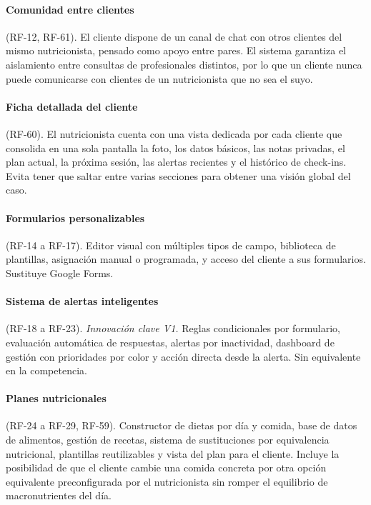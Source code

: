\paragraph{Comunidad entre clientes} (RF-12, RF-61). El cliente dispone de un canal de chat con otros clientes del mismo nutricionista, pensado como apoyo entre pares. El sistema garantiza el aislamiento entre consultas de profesionales distintos, por lo que un cliente nunca puede comunicarse con clientes de un nutricionista que no sea el suyo.

\paragraph{Ficha detallada del cliente} (RF-60). El nutricionista cuenta con una vista dedicada por cada cliente que consolida en una sola pantalla la foto, los datos básicos, las notas privadas, el plan actual, la próxima sesión, las alertas recientes y el histórico de check-ins. Evita tener que saltar entre varias secciones para obtener una visión global del caso.

\paragraph{Formularios personalizables} (RF-14 a RF-17). Editor visual con múltiples tipos de campo, biblioteca de plantillas, asignación manual o programada, y acceso del cliente a sus formularios. Sustituye Google Forms.

\paragraph{Sistema de alertas inteligentes} (RF-18 a RF-23). \textit{Innovación clave V1.} Reglas condicionales por formulario, evaluación automática de respuestas, alertas por inactividad, dashboard de gestión con prioridades por color y acción directa desde la alerta. Sin equivalente en la competencia.

\paragraph{Planes nutricionales} (RF-24 a RF-29, RF-59). Constructor de dietas por día y comida, base de datos de alimentos, gestión de recetas, sistema de sustituciones por equivalencia nutricional, plantillas reutilizables y vista del plan para el cliente. Incluye la posibilidad de que el cliente cambie una comida concreta por otra opción equivalente preconfigurada por el nutricionista sin romper el equilibrio de macronutrientes del día.

